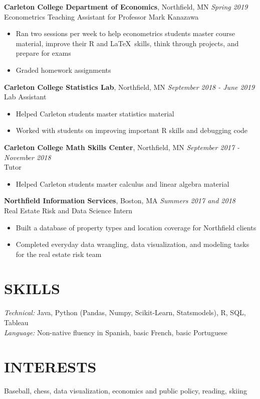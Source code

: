 \documentclass[margin, 10pt]{res} %
\begin{document}
\begin{resume}
{\sl} \textbf{Carleton College Department of Economics}, Northfield, MN \hfill \textit{Spring 2019}\\
{\sl} Econometrics Teaching Assistant for Professor Mark Kanazawa\smallskip
{\sl} \begin{itemize}
	\item Ran two sessions per week to help econometrics students master course material, improve their R and \LaTeX \ skills, think through projects, and prepare for exams
	\item Graded homework assignments
\end{itemize}


{\sl} \textbf{Carleton College Statistics Lab}, Northfield, MN \hfill \textit{September 2018 - June 2019}\\
{\sl} Lab Assistant \smallskip
{\sl} \begin{itemize}
\item Helped Carleton students master statistics material
\item Worked with students on improving important R skills and debugging code
\end{itemize}

{\sl} \textbf{Carleton College Math Skills Center}, Northfield, MN \hfill \textit{September 2017 - November 2018}\\
{\sl} Tutor \smallskip
{\sl} \begin{itemize}
\item Helped Carleton students master calculus and linear algebra material
\end{itemize}

{\sl} \textbf{Northfield Information Services}, Boston, MA \hfill \textit{Summers 2017 and 2018}\\
{\sl} Real Estate Risk and Data Science Intern \smallskip
{\sl} \begin{itemize}
\item Built a database of property types and location coverage for Northfield clients
\item Completed everyday data wrangling, data visualization, and modeling tasks for the real estate risk team
\end{itemize}


\section{SKILLS}
{\sl Technical:} Java, Python (Pandas, Numpy, Scikit-Learn, Statsmodels), R, SQL, Tableau\\ \smallskip
{\sl Language:} Non-native fluency in Spanish, basic French, basic Portuguese

\section{INTERESTS}
{\sl} Baseball, chess, data visualization, economics and public policy, reading, skiing

\end{resume}
\end{document}
